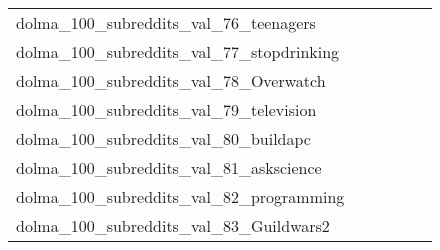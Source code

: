 {\begin{longtable}{m{6cm}m{1.7cm}m{1.7cm}m{1.7cm}m{1.7cm}m{1.7cm}}
	dolma\_100\_subreddits\_val\_76\_teenagers  & \colorbox[HTML]{ffffe5}{\makebox[\mywidth][c]{18.37}} & \colorbox[HTML]{f8fcc3}{\makebox[\mywidth][c]{16.35}} & \colorbox[HTML]{fafdca}{\makebox[\mywidth][c]{16.44}} & \colorbox[HTML]{77c578}{\makebox[\mywidth][c]{15.56}} & \colorbox[HTML]{fefee0}{\makebox[\mywidth][c]{17.02}}\\
	dolma\_100\_subreddits\_val\_77\_stopdrinking  & \colorbox[HTML]{ffffe5}{\makebox[\mywidth][c]{21.08}} & \colorbox[HTML]{9dd687}{\makebox[\mywidth][c]{20.02}} & \colorbox[HTML]{ffffe5}{\makebox[\mywidth][c]{21.19}} & \colorbox[HTML]{e2f3a9}{\makebox[\mywidth][c]{20.17}} & \colorbox[HTML]{77c578}{\makebox[\mywidth][c]{19.98}}\\
	dolma\_100\_subreddits\_val\_78\_Overwatch  & \colorbox[HTML]{ffffe5}{\makebox[\mywidth][c]{30.47}} & \colorbox[HTML]{bbe395}{\makebox[\mywidth][c]{28.77}} & \colorbox[HTML]{ffffe5}{\makebox[\mywidth][c]{31.13}} & \colorbox[HTML]{f2fab5}{\makebox[\mywidth][c]{29.13}} & \colorbox[HTML]{77c578}{\makebox[\mywidth][c]{28.57}}\\
	dolma\_100\_subreddits\_val\_79\_television  & \colorbox[HTML]{ffffe5}{\makebox[\mywidth][c]{23.97}} & \colorbox[HTML]{c5e799}{\makebox[\mywidth][c]{22.63}} & \colorbox[HTML]{ffffe5}{\makebox[\mywidth][c]{24.05}} & \colorbox[HTML]{e5f4ab}{\makebox[\mywidth][c]{22.75}} & \colorbox[HTML]{77c578}{\makebox[\mywidth][c]{22.49}}\\
	dolma\_100\_subreddits\_val\_80\_buildapc  & \colorbox[HTML]{ffffe5}{\makebox[\mywidth][c]{21.55}} & \colorbox[HTML]{dcf1a5}{\makebox[\mywidth][c]{20.22}} & \colorbox[HTML]{ffffe5}{\makebox[\mywidth][c]{21.78}} & \colorbox[HTML]{e7f5ad}{\makebox[\mywidth][c]{20.29}} & \colorbox[HTML]{77c578}{\makebox[\mywidth][c]{19.98}}\\
	dolma\_100\_subreddits\_val\_81\_askscience  & \colorbox[HTML]{ffffe5}{\makebox[\mywidth][c]{17.25}} & \colorbox[HTML]{ecf7b1}{\makebox[\mywidth][c]{16.39}} & \colorbox[HTML]{ffffe5}{\makebox[\mywidth][c]{17.52}} & \colorbox[HTML]{e3f4aa}{\makebox[\mywidth][c]{16.34}} & \colorbox[HTML]{77c578}{\makebox[\mywidth][c]{16.11}}\\
	dolma\_100\_subreddits\_val\_82\_programming  & \colorbox[HTML]{ffffe5}{\makebox[\mywidth][c]{23.66}} & \colorbox[HTML]{eff8b3}{\makebox[\mywidth][c]{22.61}} & \colorbox[HTML]{ffffe5}{\makebox[\mywidth][c]{24.04}} & \colorbox[HTML]{e5f5ac}{\makebox[\mywidth][c]{22.55}} & \colorbox[HTML]{77c578}{\makebox[\mywidth][c]{22.24}}\\
	dolma\_100\_subreddits\_val\_83\_Guildwars2  & \colorbox[HTML]{ffffe5}{\makebox[\mywidth][c]{32.98}} & \colorbox[HTML]{c9e99b}{\makebox[\mywidth][c]{31.17}} & \colorbox[HTML]{ffffe5}{\makebox[\mywidth][c]{33.58}} & \colorbox[HTML]{e9f6af}{\makebox[\mywidth][c]{31.39}} & \colorbox[HTML]{77c578}{\makebox[\mywidth][c]{30.91}}\\

\end{longtable}}
